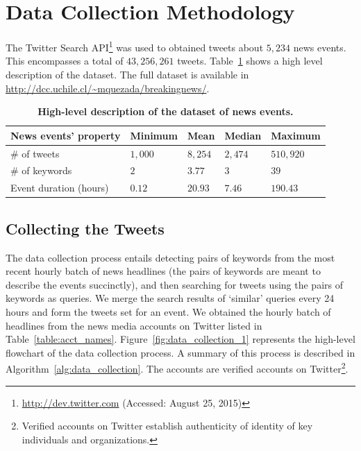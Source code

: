 \section{Data Collection Methodology}
\label{sec:data_collection_methodology}
The Twitter Search
API\footnote{\url{http://dev.twitter.com} (Accessed: August 25, 2015)} was used to obtained tweets
about $5,234$ news events.  
This encompasses a total of
$43,256,261$ tweets. Table~\ref{table:dataset-stats} shows a high level
description of the dataset.  The full
  dataset is available in
  \url{http://dcc.uchile.cl/~mquezada/breakingnews/}.


\begin{table}[h]
  \centering
  \begin{tabular}{@{}lllll@{}}
    \toprule
    \textbf{News events' property} & \textbf{Minimum} & \textbf{Mean} & \textbf{Median} & \textbf{Maximum} \\ \midrule
    \# of tweets & $1,000$ & $8,254$ & $2,474$ & $510,920$ \\
    \# of keywords & $2$ & $3.77$ & $3$ & $39$ \\ 
    Event duration (hours) & $0.12$ & $20.93$ & $7.46$ & $190.43$ \\ \bottomrule
  \end{tabular}
  \caption{\bf High-level description of the dataset of news events.} \label{table:dataset-stats}

\end{table}

\subsection{Collecting the Tweets}
\label{sec:collecting_the_data}
The data collection process entails detecting pairs
of keywords from the most recent hourly batch of news headlines (the
pairs of keywords are meant to describe the events succinctly), and
then searching for tweets using the pairs of keywords as queries.
We merge the search results of
`similar' queries every 24 hours and form the tweets set for an event.
We obtained the hourly batch of headlines from the news media accounts
on Twitter listed in Table~\ref{table:acct_names}.
Figure~\ref{fig:data_collection_1} represents the high-level flowchart
of the data collection process. A summary of this process is described
in Algorithm~\ref{alg:data_collection}.
The accounts are verified accounts on
Twitter\footnote{Verified accounts on Twitter establish authenticity
  of identity of key individuals and organizations.}.



